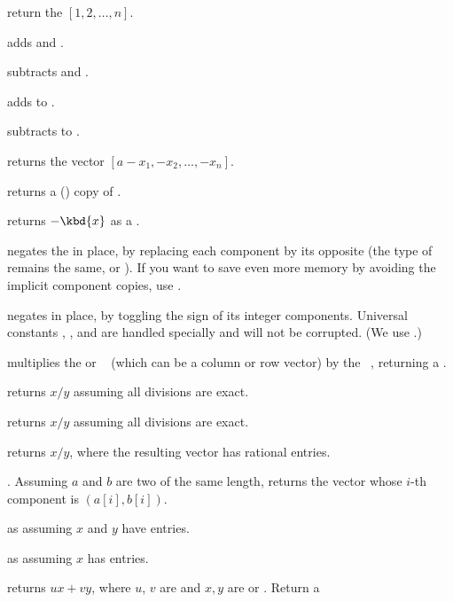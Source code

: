  return the  $[1, 2, \dots, n]$.

 adds  and .

 subtracts  and .

 adds  to .

 subtracts  to .

 returns the vector $[a - x_1,
-x_2,\dots,-x_n]$.

 returns a () copy of .

 returns $-\kbd{x}$ as a .

 negates the   in place, by
replacing each component by its opposite (the type of  remains the
same,  or ). If you want to save even more memory by
avoiding the implicit component copies, use .

 negates  in place, by toggling the
sign of its integer components. Universal constants ,
,  and  are handled specially and will
not be corrupted. (We use .)

 multiplies the  or ~
(which can be a column or row vector) by the ~, returning a
.

 returns $x/y$ assuming all divisions
are exact.

 returns $x/y$ assuming all divisions
are exact.

 returns $x/y$, where the resulting vector
has rational entries.

. Assuming $a$ and $b$ are two 
of the same length, returns the vector whose $i$-th component
is $(a[i], b[i])$.

 as  assuming $x$
and $y$ have  entries.

 as  assuming $x$
has  entries.

 returns $ux + vy$, where
$u$, $v$ are  and $x,y$ are  or . Return a 

